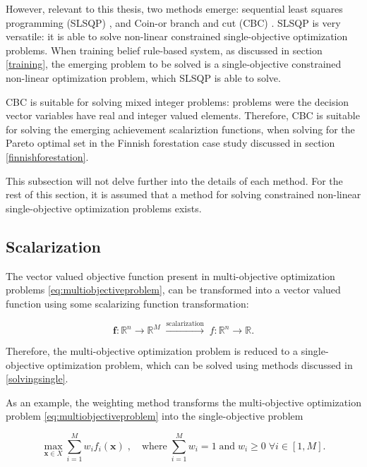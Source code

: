 However, relevant to this thesis, two methods emerge: sequential least squares programming (SLSQP) \cite[chapter 10]{jorgenocedal2006},
and Coin-or branch and cut (CBC) \cite{zenodo2018}. SLSQP is very versatile: it is able to solve non-linear constrained single-objective 
optimization problems. When training belief rule-based system, as discussed in section \ref{training}, the emerging problem to be
solved is a single-objective constrained non-linear optimization problem, which SLSQP is able to solve.

CBC is suitable for solving mixed integer problems: problems were the decision vector variables have real and integer valued
elements. Therefore, CBC is suitable for solving the emerging achievement scalariztion functions, when solving for the Pareto optimal set
in the Finnish forestation case study discussed in section \ref{finnishforestation}.

This subsection will not delve further into the details of each method. For the rest of this section, it is assumed that a method
for solving constrained non-linear single-objective optimization problems exists.

\subsection{Scalarization}
The vector valued objective function present in multi-objective optimization problems \ref{eq:multiobjectiveproblem}, can be transformed
into a vector valued function using some scalarizing function transformation:

\begin{equation}
    \label{eq:funstransform}
    \mathbf{f}: \mathbb{R}^n \to \mathbb{R}^M \;\xrightarrow{{\text{scalarization}}}\; f: \mathbb{R}^n \to \mathbb{R}.
\end{equation}

Therefore, the multi-objective optimization problem is reduced to a single-objective optimization problem, which can be solved using
methods discussed in \ref{solvingsingle}.

As an example, the weighting method transforms the multi-objective optimization problem \ref{eq:multiobjectiveproblem}
into the single-objective problem

\begin{equation}
    \label{eq:weighting}
    \max_{\mathbf{x} \in X} \sum_{i=1}^{M} w_i f_i(\mathbf{x}) \; ,\quad\text{where}\;\sum_{i=1}^{M}w_i = 1\;\text{and}\;w_i \ge 0\;\forall i\in [1, M].
\end{equation}

